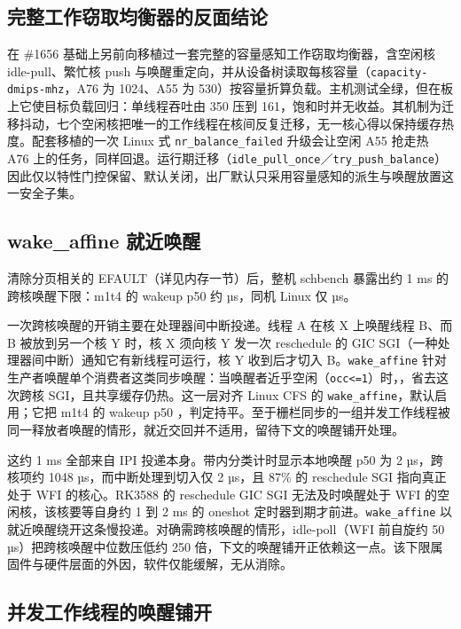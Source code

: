 \subsection{完整工作窃取均衡器的反面结论}

在 \#1656 基础上另前向移植过一套完整的容量感知工作窃取均衡器，含空闲核 idle-pull、繁忙核 push 与唤醒重定向，并从设备树读取每核容量（\texttt{capacity-dmips-mhz}，A76 为 1024、A55 为 530）按容量折算负载。主机测试全绿，但在板上它使目标负载回归：单线程吞吐由 350 压到 161，饱和时并无收益。其机制为迁移抖动，七个空闲核把唯一的工作线程在核间反复迁移，无一核心得以保持缓存热度。配套移植的一次 Linux 式 \texttt{nr\_balance\_failed} 升级会让空闲 A55 抢走热 A76 上的任务，同样回退。运行期迁移（\texttt{idle\_pull\_once}／\texttt{try\_push\_balance}）因此仅以特性门控保留、默认关闭，出厂默认只采用容量感知的派生与唤醒放置这一安全子集。

\subsection{wake\_affine 就近唤醒}

清除分页相关的 EFAULT（详见内存一节）后，整机 schbench 暴露出约 1 ms 的跨核唤醒下限：m1t4 的 wakeup p50 约 \nWakeBefore{} µs，同机 Linux 仅 \nWakeLin{} µs。

一次跨核唤醒的开销主要在处理器间中断投递。线程 A 在核 X 上唤醒线程 B、而 B 被放到另一个核 Y 时，核 X 须向核 Y 发一次 reschedule 的 GIC SGI（一种处理器间中断）通知它有新线程可运行，核 Y 收到后才切入 B。\texttt{wake\_affine} 针对生产者唤醒单个消费者这类同步唤醒：当唤醒者近乎空闲（\texttt{occ<=1}）时，，省去这次跨核 SGI，且共享缓存仍热。这一层对齐 Linux CFS 的 \texttt{wake\_affine}，默认启用；它把 m1t4 的 wakeup p50 ，判定持平。至于栅栏同步的一组并发工作线程被同一释放者唤醒的情形，就近交回并不适用，留待下文的唤醒铺开处理。

这约 1 ms 全部来自 IPI 投递本身。带内分类计时显示本地唤醒 p50 为 2 µs，跨核项约 1048 µs，而中断处理到切入仅 2 µs，且 87\% 的 reschedule SGI 指向真正处于 WFI 的核心。RK3588 的 reschedule GIC SGI 无法及时唤醒处于 WFI 的空闲核，该核要等自身约 1 到 2 ms 的 oneshot 定时器到期才前进。\texttt{wake\_affine} 以就近唤醒绕开这条慢投递。对确需跨核唤醒的情形，idle-poll（WFI 前自旋约 50 µs）把跨核唤醒中位数压低约 250 倍，下文的唤醒铺开正依赖这一点。该下限属固件与硬件层面的外因，软件仅能缓解，无从消除。

\subsection{并发工作线程的唤醒铺开}

